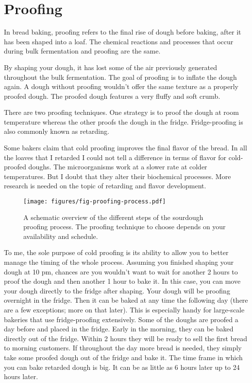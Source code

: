\section{Proofing}

In bread baking, proofing refers to the final rise of dough before baking,
after it has been shaped into a loaf. The chemical reactions and processes
that occur during bulk fermentation and proofing are the same.

By shaping your dough, it has lost some of the air previously generated
throughout the bulk fermentation. The goal of proofing is to inflate
the dough again. A dough without proofing wouldn't offer the same texture
as a properly proofed dough. The proofed dough features a very fluffy
and soft crumb.

There are two proofing techniques. One strategy is to proof the dough
at room temperature whereas the other proofs the dough in the fridge.
Fridge-proofing is also commonly known as retarding.

Some bakers claim that cold proofing improves the final flavor of the bread.
In all the loaves that I retarded I could not tell a difference
in terms of flavor for cold-proofed doughs. The microorganisms work
at a slower rate at colder temperatures. But I doubt that they alter
their biochemical processes. More research is needed on the topic
of retarding and flavor development.

\begin{figure}[!htb]
  \texttt{[image: figures/fig-proofing-process.pdf]}
  \caption{A schematic overview of the different steps of the sourdough proofing process. The proofing technique to choose
  depends on your availability and schedule.}
  \label{fig:proofing-process}
\end{figure}

To me, the sole purpose of cold proofing is its ability to allow you
to better manage the timing of the whole process. Assuming you finished shaping
your dough at 10 pm, chances are you wouldn't want to wait for another
2 hours to proof the dough and then another 1 hour to bake it. In this case,
you can move your dough directly to the fridge after shaping. Your
dough will be proofing overnight in the fridge. Then it can be baked at any time
the following day (there are a few exceptions; more on that later).
This is especially handy for large-scale bakeries that use fridge-proofing
extensively. Some of the doughs are proofed a day before and placed in the fridge.
Early in the morning, they can be baked directly out of the fridge. Within 2
hours they will be ready to sell the first bread to morning customers. If
throughout the day more bread is needed, they simply take some proofed dough out
of the fridge and bake it. The time frame in which you can bake retarded
dough is big. It can be as little as 6 hours later up to 24 hours later.

